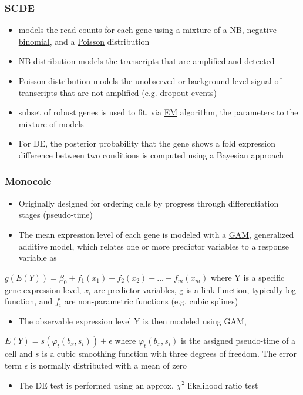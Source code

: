 \documentclass{beamer}\usepackage[]{graphicx}\usepackage[]{color}
\begin{document}
\begin{frame}
\frametitle{SCDE}
\begin{itemize}
  \item models the read counts for each gene using a mixture of a NB, \href{https://onlinecourses.science.psu.edu/stat414/node/55}{negative binomial}, and a \href{https://onlinecourses.science.psu.edu/stat414/node/81}{Poisson} distribution 
  \item NB distribution models the transcripts that are amplified and detected
  \item Poisson distribution models the unobserved or background-level signal of transcripts that are not amplified (e.g. dropout events)
  \item subset of robust genes is used to fit, via \href{http://www.nature.com/nbt/journal/v26/n8/full/nbt1406.html?foxtrotcallback=true}{EM} algorithm, the parameters to the mixture of models
  \item For DE, the posterior probability that the gene shows a fold expression difference between two conditions is computed using a Bayesian approach
\end{itemize}
\end{frame}


\begin{frame}
\frametitle{Monocole}
\begin{itemize}
\item Originally designed for ordering cells by progress through differentiation stages (pseudo-time)
\item The mean expression level of each gene is modeled with a \href{https://en.wikipedia.org/wiki/Generalized_additive_model}{GAM}, generalized additive model, which relates one or more predictor variables to a response variable as  
\end{itemize}
   \begin{center}
    $g(E(Y))=\beta_0+f_1(x_1)+f_2(x_2)+...+f_m(x_m)$ where Y is a specific gene expression level, $x_i$ are predictor variables, g is a link function, typically log function, and $f_i$ are non-parametric functions (e.g. cubic splines)
  \end{center}
\begin{itemize}  
\item The observable expression level Y is then modeled using GAM, 
\end{itemize}
$E(Y)=s(\varphi_t(b_x, s_i))+\epsilon$ where $\varphi_t(b_x, s_i)$ is the assigned pseudo-time of a cell and $s$ is a cubic smoothing function with three degrees of freedom. The error term $\epsilon$ is normally distributed with a mean of zero
\begin{itemize}
\item The DE test is performed using an approx. $\chi^2$ likelihood ratio test
\end{itemize}
\end{frame}
\end{document}
